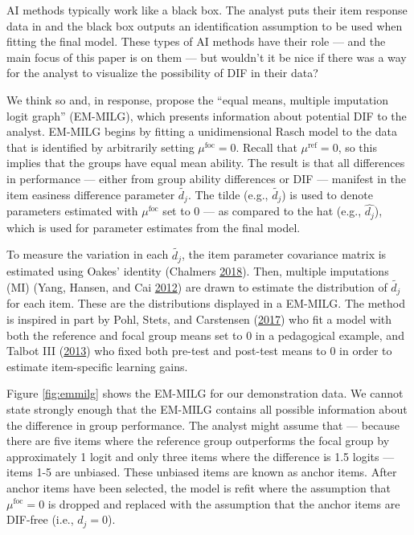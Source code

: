 \documentclass[
  11pt,
]{article}
\begin{document}
AI methods typically work like a black box. The analyst puts their item response data in and the black box outputs an identification assumption to be used when fitting the final model. These types of AI methods have their role --- and the main focus of this paper is on them --- but wouldn't it be nice if there was a way for the analyst to visualize the possibility of DIF in their data?

We think so and, in response, propose the \enquote{equal means, multiple imputation logit graph} (EM-MILG), which presents information about potential DIF to the analyst. EM-MILG begins by fitting a unidimensional Rasch model to the data that is identified by arbitrarily setting \(\mu^\text{foc} = 0\). Recall that \(\mu^\text{ref} = 0\), so this implies that the groups have equal mean ability. The result is that all differences in performance --- either from group ability differences or DIF --- manifest in the item easiness difference parameter \(\tilde{d_j}\). The tilde (e.g., \(\tilde{d_j}\)) is used to denote parameters estimated with \(\mu^\text{foc}\) set to \(0\) --- as compared to the hat (e.g., \(\hat{d_j}\)), which is used for parameter estimates from the final model.

To measure the variation in each \(\tilde{{d_j}}\), the item parameter covariance matrix is estimated using Oakes' identity (Chalmers \protect\hyperlink{ref-chalmers2018numerical}{2018}). Then, multiple imputations (MI) (Yang, Hansen, and Cai \protect\hyperlink{ref-yang2012characterizing}{2012}) are drawn to estimate the distribution of \(\tilde{d_j}\) for each item. These are the distributions displayed in a EM-MILG. The method is inspired in part by Pohl, Stets, and Carstensen (\protect\hyperlink{ref-pohl2017cluster}{2017}) who fit a model with both the reference and focal group means set to 0 in a pedagogical example, and Talbot III (\protect\hyperlink{ref-talbot2013taking}{2013}) who fixed both pre-test and post-test means to 0 in order to estimate item-specific learning gains.

Figure \ref{fig:emmilg} shows the EM-MILG for our demonstration data. We cannot state strongly enough that the EM-MILG contains all possible information about the difference in group performance. The analyst might assume that --- because there are five items where the reference group outperforms the focal group by approximately 1 logit and only three items where the difference is 1.5 logits --- items 1-5 are unbiased. These unbiased items are known as anchor items. After anchor items have been selected, the model is refit where the assumption that \(\mu^\text{foc} = 0\) is dropped and replaced with the assumption that the anchor items are DIF-free (i.e., \(d_j = 0\)).
\end{document}
